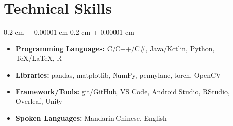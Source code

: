 \documentclass[10pt, letterpaper]{article}
\newenvironment{highlightsforbulletentries}{
    \begin{itemize}[
        topsep=0.10 cm,
        parsep=0.10 cm,
        partopsep=0pt,
        itemsep=0pt,
        leftmargin=10pt
    ]
}{
    \end{itemize}
} %
\newenvironment{onecolentry}{
    \begin{adjustwidth}{
        0.2 cm + 0.00001 cm
    }{
        0.2 cm + 0.00001 cm
    }
}{
    \end{adjustwidth}
} %
\begin{document}

        \vspace{0.3 cm}

    
    \section{Technical Skills}
        \begin{onecolentry}
            \begin{highlightsforbulletentries}
                \item \textbf{Programming Languages:} C/C++/C\#, Java/Kotlin, Python, TeX/LaTeX, R
                \item \textbf{Libraries:} pandas, matplotlib, NumPy, pennylane, torch, OpenCV
                \item \textbf{Framework/Tools:} git/GitHub, VS Code, Android Studio, RStudio, Overleaf, Unity
                \item \textbf{Spoken Languages:} Mandarin Chinese, English
            \end{highlightsforbulletentries}
        \end{onecolentry}
\end{document}

